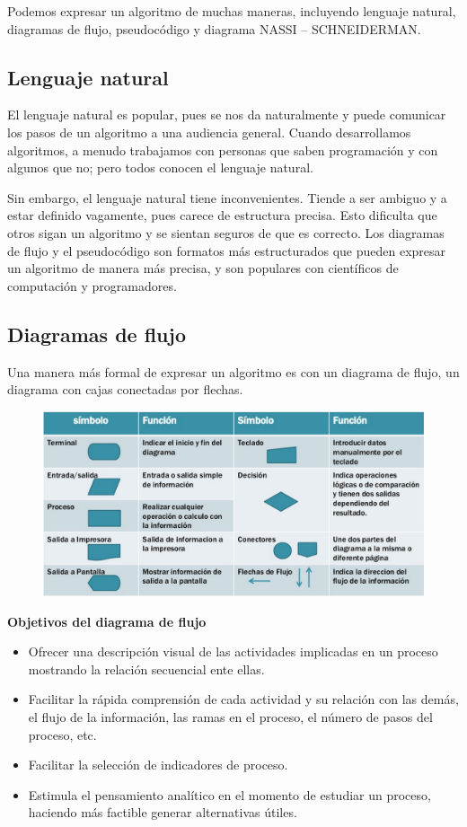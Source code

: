 Podemos expresar un algoritmo de muchas maneras, incluyendo lenguaje natural, diagramas de flujo, pseudocódigo y diagrama NASSI – SCHNEIDERMAN.

\subsection{Lenguaje natural}
El lenguaje natural es popular, pues se nos da naturalmente y puede comunicar los pasos de un algoritmo a una audiencia general. Cuando desarrollamos algoritmos, a menudo trabajamos con personas que saben programación y con algunos que no; pero todos conocen el lenguaje natural.

Sin embargo, el lenguaje natural tiene inconvenientes. Tiende a ser ambiguo y a estar definido vagamente, pues carece de estructura precisa. Esto dificulta que otros sigan un algoritmo y se sientan seguros de que es correcto. Los diagramas de flujo y el pseudocódigo son formatos más estructurados que pueden expresar un algoritmo de manera más precisa, y son populares con científicos de computación y programadores.

\subsection{Diagramas de flujo}

Una manera más formal de expresar un algoritmo es con un diagrama de flujo, un diagrama con cajas conectadas por flechas.

\begin{figure}[h!]
	\centering
	\includegraphics[width=0.9\linewidth]{img/simbolos_diagrama}
	\label{fig:simbolosdiagrama}
\end{figure}

\textbf{Objetivos del diagrama de flujo}

\begin{itemize}
	\item Ofrecer una descripción visual de las actividades implicadas en un proceso mostrando la relación secuencial ente ellas.
	\item Facilitar la rápida comprensión de cada actividad y su relación con las demás, el flujo de la información, las ramas en el proceso, el número de pasos del proceso, etc. 
	\item Facilitar la selección de indicadores de proceso. 
	\item Estimula el pensamiento analítico en el momento de estudiar un proceso, haciendo más factible generar alternativas útiles. 
\end{itemize}


